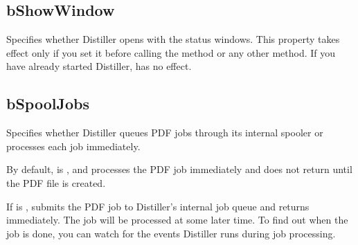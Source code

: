 \documentclass[letterpaper,12pt,english,openany,oneside]{sphinxmanual}
\begin{document}




\subsection{bShowWindow}
\label{\detokenize{Distiller_AutomationIntro:bshowwindow}}
Specifies whether Distiller opens with the status windows. This property takes effect only if you set it before calling the  method or any other method. If you have already started Distiller,  has no effect.


\begin{sphinxVerbatim}[commandchars=\\\{\}]
\PYG{p}{[}\PYG{p}{]}  
\end{sphinxVerbatim}




\subsection{bSpoolJobs}
\label{\detokenize{Distiller_AutomationIntro:bspooljobs}}
Specifies whether Distiller queues PDF jobs through its internal spooler or processes each job immediately.

By default,  is  , and  processes the PDF job immediately and does not return until the PDF file is created.

If  is  ,  submits the PDF job to Distiller’s internal job queue and returns immediately. The job will be processed at some later time. To find out when the job is done, you can watch for the events Distiller runs during job processing.


\begin{sphinxVerbatim}[commandchars=\\\{\}]
\PYG{p}{[}\PYG{p}{]}  
\end{sphinxVerbatim}
\end{document}
